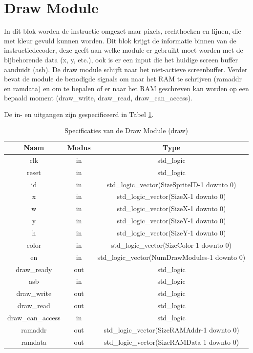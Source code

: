 \documentclass{scrreprt} %
\begin{document}
\section{Draw Module}
In dit blok worden de instructie omgezet naar pixels, rechthoeken en lijnen, die met kleur gevuld kunnen worden.
Dit blok krijgt de informatie binnen van de instructiedecoder, deze geeft aan welke module er gebruikt moet worden met de bijbehorende data (x, y, etc.), ook is er een input die het huidige screen buffer aanduidt (asb).
De draw module schijft naar het niet-actieve screenbuffer.
Verder bevat de module de benodigde signals om naar het RAM te schrijven (ramaddr en ramdata) en om te bepalen of er naar het RAM geschreven kan worden op een bepaald moment (draw\_write, draw\_read, draw\_can\_access).

De in- en uitgangen zijn gespecificeerd in Tabel \ref{tab:spec-draw}.

\begin{table}[H]
\centering
\caption{Specificaties van de Draw Module (draw)}
\label{tab:spec-draw}
\begin{tabular}{c c c}
	\hline\hline
 	Naam & Modus & Type\\
 	\hline	
	 clk & in & std\_logic \\
	 reset & in & std\_logic \\
	id & in & std\_logic\_vector(SizeSpriteID-1 downto 0) \\
	 x & in & std\_logic\_vector(SizeX-1 downto 0) \\ 
	 w & in & std\_logic\_vector(SizeX-1 downto 0) \\
	 y & in & std\_logic\_vector(SizeY-1 downto 0) \\
	 h & in & std\_logic\_vector(SizeY-1 downto 0) \\ 
	 color & in & std\_logic\_vector(SizeColor-1 downto 0) \\ 
	 en & in & std\_logic\_vector(NumDrawModules-1 downto 0) \\ 
	 draw\_ready & out & std\_logic \\
	 asb & in & std\_logic \\ 
	 draw\_write & out & std\_logic \\
	 draw\_read & out & std\_logic \\
	 draw\_can\_access & in & std\_logic \\
	 ramaddr & out & std\_logic\_vector(SizeRAMAddr-1 downto 0) \\
	 ramdata & out & std\_logic\_vector(SizeRAMData-1 downto 0) \\
  	\hline
\end{tabular}
\end{table}
\end{document}
